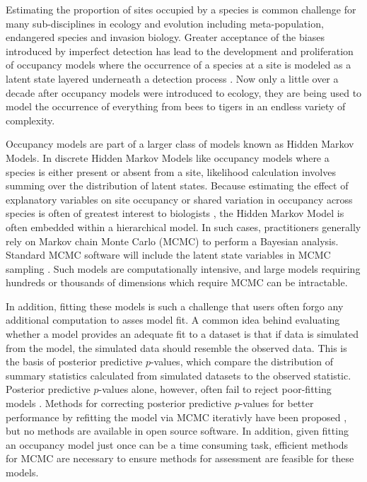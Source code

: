 \documentclass[12pt]{article}
\begin{document}
Estimating the proportion of sites occupied by a species is common
challenge for many sub-disciplines in ecology and evolution including
meta-population, endangered species and invasion biology. Greater
acceptance of the biases introduced by imperfect detection has lead to
the development and proliferation of occupancy models where the
occurrence of a species at a site is modeled as a latent state layered
underneath a detection process \citep[e.g.,][]{mackenzie-2006,
  royle-2007-1813}. Now only a little over a decade after occupancy
models were introduced to ecology, they are being used to model the
occurrence of everything from bees \citep{mgonigle-2015-x} to tigers
\citep{hines2010tigers} in an endless variety of complexity.

Occupancy models are part of a larger class of models known as Hidden
Markov Models. In discrete Hidden Markov Models like occupancy models
where a species is either present or absent from a site, likelihood
calculation involves summing over the distribution of latent
states. Because estimating the effect of explanatory variables on site
occupancy or shared variation in occupancy across species is often of
greatest interest to biologists \citep[e.g.,][]{iknayan2014detecting},
the Hidden Markov Model is often embedded within a hierarchical
model. In such cases, practitioners generally rely on Markov chain
Monte Carlo (MCMC) to perform a Bayesian analysis. Standard MCMC
software will include the latent state variables in MCMC sampling
\citep[e.g.,][]{plummer-2003-jags, winbugs, openbugs}. Such models are
computationally intensive, and large models requiring hundreds or
thousands of dimensions which require MCMC can be intractable.

In addition, fitting these models is such a challenge that users often
forgo any additional computation to asses model fit. A common idea
behind evaluating whether a model provides an adequate fit to a
dataset is that if data is simulated from the model, the simulated
data should resemble the observed data. This is the basis of posterior
predictive $p$-values, which compare the distribution of summary
statistics calculated from simulated datasets to the observed
statistic. Posterior predictive $p$-values alone, however, often fail
to reject poor-fitting models \citep{bayarri-berger-00,
  robins-etal-00, hjort-etal-06}. Methods for correcting posterior
predictive $p$-values for better performance by refitting the model
via MCMC iterativly have been proposed \citep[e.g., calibrated
posterior predictive $p$-values, ][]{hjort-etal-06}, but no methods
are available in open source software. In addition, given fitting an
occupancy model just once can be a time consuming task, efficient
methods for MCMC are necessary to ensure methods for assessment are
feasible for these models.
\end{document}
